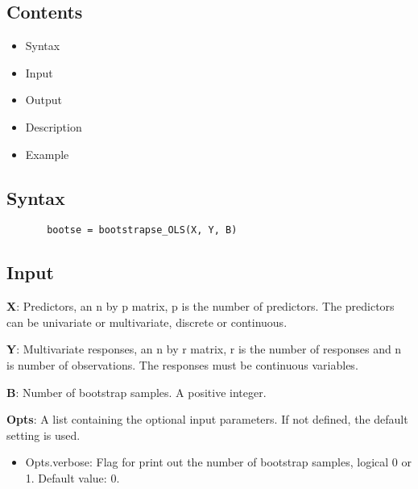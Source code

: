 \documentclass[a4paper,11pt,openany]{memoir}
\begin{document}
\subsection*{Contents}

\begin{itemize}
\setlength{\itemsep}{-1ex}
   \item Syntax
   \item Input
   \item Output
   \item Description
   \item Example
\end{itemize}


\subsection*{Syntax}


\begin{verbatim}       bootse = bootstrapse_OLS(X, Y, B)\end{verbatim}
    

\subsection*{Input}

\begin{par}
\textbf{X}: Predictors, an n by p matrix, p is the number of predictors.  The predictors can be univariate or multivariate, discrete or continuous.
\end{par} \vspace{1em}
\begin{par}
\textbf{Y}: Multivariate responses, an n by r matrix, r is the number of responses and n is number of observations.  The responses must be continuous variables.
\end{par} \vspace{1em}
\begin{par}
\textbf{B}: Number of bootstrap samples.  A positive integer.
\end{par} \vspace{1em}
\begin{par}
\textbf{Opts}: A list containing the optional input parameters. If not defined, the default setting is used.
\end{par} \vspace{1em}
\begin{itemize}
\setlength{\itemsep}{-1ex}
   \item Opts.verbose: Flag for print out the number of bootstrap samples, logical 0 or 1. Default value: 0.
\end{itemize}
\end{document}
